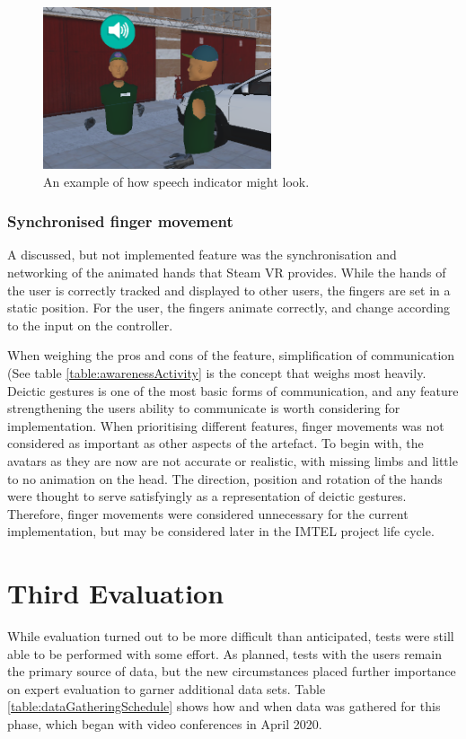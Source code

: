 \begin{figure}[H]
  \centering
   \captionsetup{width=.6\linewidth}
    \includegraphics[width=0.6\textwidth]{fig/phase_3/implementation/speechIndicator.PNG}
 \caption{An example of how speech indicator might look.}
\label{fig:phase3_speech}
\end{figure}


\subsubsection{Synchronised finger movement}
A discussed, but not implemented feature was the synchronisation and networking of the animated hands that Steam VR provides. While the hands of the user is correctly tracked and displayed to other users, the fingers are set in a static position. For the user, the fingers animate correctly, and change according to the input on the controller.

When weighing the pros and cons of the feature, simplification of communication (See table \ref{table:awarenessActivity} is the concept that weighs most heavily. Deictic gestures is one of the most basic forms of communication, and any feature strengthening the users ability to communicate is worth considering for implementation. When prioritising different features, finger movements was not considered as important as other aspects of the artefact. To begin with, the avatars as they are now are not accurate or realistic, with missing limbs and little to no animation on the head. The direction, position and rotation of the hands were thought to serve satisfyingly as a representation of deictic gestures. Therefore, finger movements were considered unnecessary for the current implementation, but may be considered later in the IMTEL project life cycle.



\section{Third Evaluation}
\label{section:evalPhase3}
While evaluation turned out to be more difficult than anticipated, tests were still able to be performed with some effort. As planned, tests with the  users remain the primary source of data, but the new circumstances placed further importance on expert evaluation to garner additional data sets. Table \ref{table:dataGatheringSchedule} shows how and when data was gathered for this phase, which began with video conferences in April 2020. 


